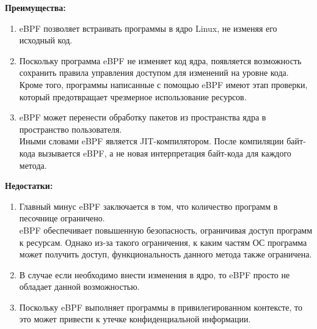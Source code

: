 \textbf{Преимущества:}

\begin{enumerate}
    \item eBPF позволяет встраивать программы в ядро Linux, не изменяя его исходный код.
    \item Поскольку программа eBPF не изменяет код ядра, появляется возможность сохранить правила управления доступом для изменений на уровне кода.
    Кроме того, программы написанные с помощью eBPF имеют этап проверки, который предотвращает чрезмерное использование ресурсов.
    \item eBPF может перенести обработку пакетов из пространства ядра в пространство пользователя. \vspace{5mm}\\
    Иными словами eBPF является JIT-компилятором.
    После компиляции байт-кода вызывается eBPF, а не новая интерпретация байт-кода для каждого метода.\\
\end{enumerate}

\textbf{Недостатки:}

\begin{enumerate}
    \item Главный минус eBPF заключается в том, что количество программ в песочнице ограничено. \vspace{5mm}\\
    eBPF обеспечивает повышенную безопасность, ограничивая доступ программ к ресурсам.
    Однако из-за такого ограничения, к каким частям ОС программа может получить доступ, функциональность данного метода также ограничена.
    \item В случае если необходимо внести изменения в ядро, то eBPF просто не обладает данной возможностью.
    \item Поскольку eBPF выполняет программы в привилегированном контексте, то это может привести к утечке конфиденциальной информации.
\end{enumerate}

